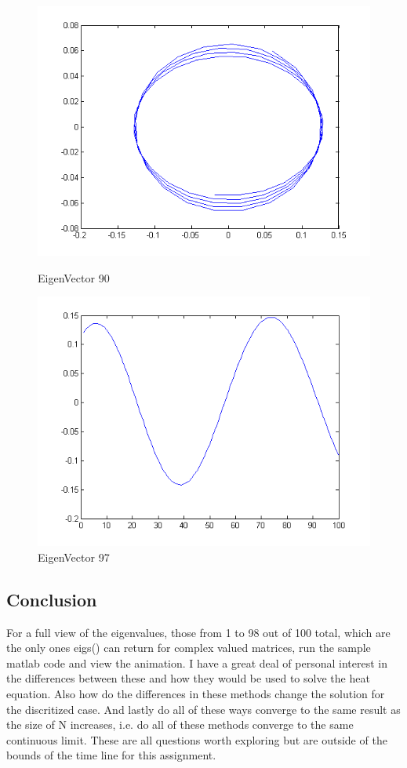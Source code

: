 \documentclass[12pt]{article}
\begin{document}
\begin{figure}[H]
\begin{minipage}[b]{0.5\linewidth}
\includegraphics[scale=.5]{v3p90.png}
\caption{EigenVector 90}
\end{minipage}
\begin{minipage}[b]{0.5\linewidth}
\includegraphics[scale=.5]{v3p97.png}
\caption{EigenVector 97}
\end{minipage}
\end{figure}

\subsection*{Conclusion}

For a full view of the eigenvalues, those from 1 to 98 out of 100 total, which are the only ones eigs() can return for complex valued matrices, run the sample matlab code and view the animation. I have a great deal of personal interest in the differences between these and how they would be used to solve the heat equation. Also how do the differences in these methods change the solution for the discritized case. And lastly do all of these ways converge to the same result as the size of N increases, i.e. do all of these methods converge to the same continuous limit. These are all questions worth exploring but are outside of the bounds of the time line for this assignment.
\end{document}
